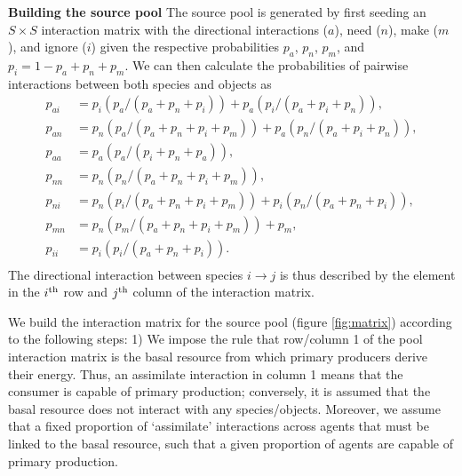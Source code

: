 \documentclass[twocolumn,preprintnumbers,amsmath,amssymb,superscriptaddress]{revtex4}
\begin{document}
\textbf{Building the source pool} The source pool is generated by first seeding an $S \times S$ interaction matrix with the directional interactions ($a$), need ($n$), make ($m$), and ignore ($i$) given the respective probabilities $p_a$, $p_n$, $p_m$, and $p_i = 1 - p_a + p_n + p_m$. 
We can then calculate the probabilities of pairwise interactions between both species and objects as 
\begin{align}
  p_{ai} &= p_i(p_a/(p_a+p_n+p_i)) + p_a(p_i/(p_a+p_i+p_n)), \\ \nonumber
  p_{an} &= p_n(p_a/(p_a+p_n+p_i+p_m)) + p_a(p_n/(p_a+p_i+p_n)), \\ \nonumber
  p_{aa} &= p_a(p_a/(p_i+p_n+p_a)), \\ \nonumber
  p_{nn} &= p_n(p_n/(p_a+p_n+p_i+p_m)), \\ \nonumber
  p_{ni} &= p_n(p_i/(p_a+p_n+p_i+p_m)) + p_i(p_n/(p_a+p_n+p_i)), \\ \nonumber
  p_{mn} &= p_n(p_m/(p_a+p_n+p_i+p_m)) + p_m, \\ \nonumber
  p_{ii} &= p_i(p_i/(p_a+p_n+p_i)).\\ \nonumber
\end{align}
The directional interaction between species $i \rightarrow j$ is thus described by the element in the $i^{\rm th}$ row and $j^{\rm th}$ column of the interaction matrix.

We build the interaction matrix for the source pool (figure \ref{fig:matrix}) according to the following steps:
1) We impose the rule that row/column 1 of the pool interaction matrix is the basal resource from which primary producers derive their energy.
Thus, an assimilate interaction in column 1 means that the consumer is capable of primary production; conversely, it is assumed that the basal resource does not interact with any species/objects.
Moreover, we assume that a fixed proportion of `assimilate' interactions across agents that must be linked to the basal resource, such that a given proportion of agents are capable of primary production.
\end{document}
